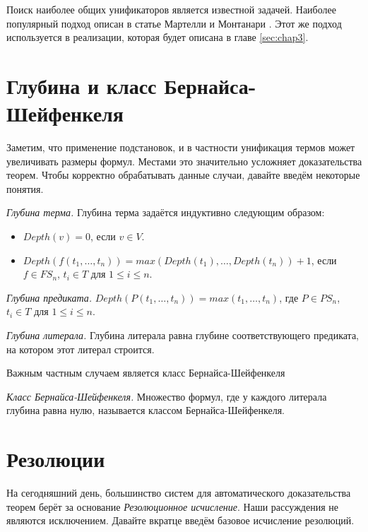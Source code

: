Поиск наиболее общих унификаторов является известной задачей. Наиболее популярный подход описан в статье Мартелли и Монтанари \cite{Martelli:1982:EUA:357162.357169}. Этот же подход используется в реализации, которая будет описана в главе \ref{sec:chap3}.

\section{Глубина и класс Бернайса-Шейфенкеля}
\label{sec:depth}
Заметим, что применение подстановок, и в частности унификация термов может увеличивать размеры формул. Местами это значительно усложняет доказательства теорем. Чтобы корректно обрабатывать данные случаи, давайте введём некоторые понятия.

\begin{definition}
\emph{Глубина терма.} Глубина терма задаётся индуктивно следующим образом: 
      \begin{itemize}
      	\item $Depth(v) = 0$, если $v \in V$. 
        \item $Depth(f(t_1, \ldots, t_n)) = max(Depth(t_1), \ldots, Depth(t_n)) + 1$, если $f \in FS_n$, $t_i \in T$ для $1 \leq i \leq n$.
      \end{itemize}
      
\emph{Глубина предиката.} $Depth(P(t_1, \ldots, t_n)) = max(t_1, \ldots, t_n)$, где $P \in PS_n$, $t_i \in T$ для $1 \leq i \leq n$.

\emph{Глубина литерала.} Глубина литерала равна глубине соответствующего предиката, на котором этот литерал строится.
\end{definition}

Важным частным случаем является класс Бернайса-Шейфенкеля

\begin{definition}
\emph{Класс Бернайса-Шейфенкеля.} Множество формул, где у каждого литерала глубина равна нулю, называется классом Бернайса-Шейфенкеля.
\end{definition}

\section{Резолюции}

На сегодняшний день, большинство систем для автоматического доказательства теорем берёт за основание \emph{Резолюционное исчисление}. Наши рассуждения не являются исключением. Давайте вкратце введём базовое исчисление резолюций.

